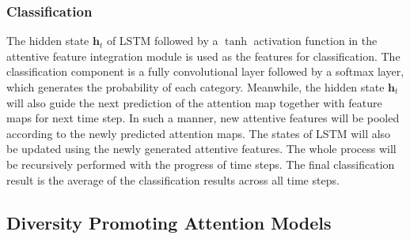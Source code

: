 \documentclass[journal]{IEEEtran}
\begin{document}
\subsubsection{Classification}
The hidden state $\mathbf{h}_t$ of LSTM followed by a $\tanh$ activation function in the attentive feature integration module is used as the features for classification. The classification component is a fully convolutional layer followed by a softmax layer, which generates the probability of each category. Meanwhile, the hidden state $\mathbf{h}_t$ will also guide the next prediction of the attention map together with feature maps for next time step. In such a manner, new attentive features will be pooled according to the newly predicted attention maps. The states of LSTM will also be updated using the newly generated attentive features. The whole process will be recursively performed with the progress of time steps.
The final classification result is the average of the classification results across all time steps.

\subsection{Diversity Promoting Attention Models}
\label{sec:Diversity}
\end{document}

